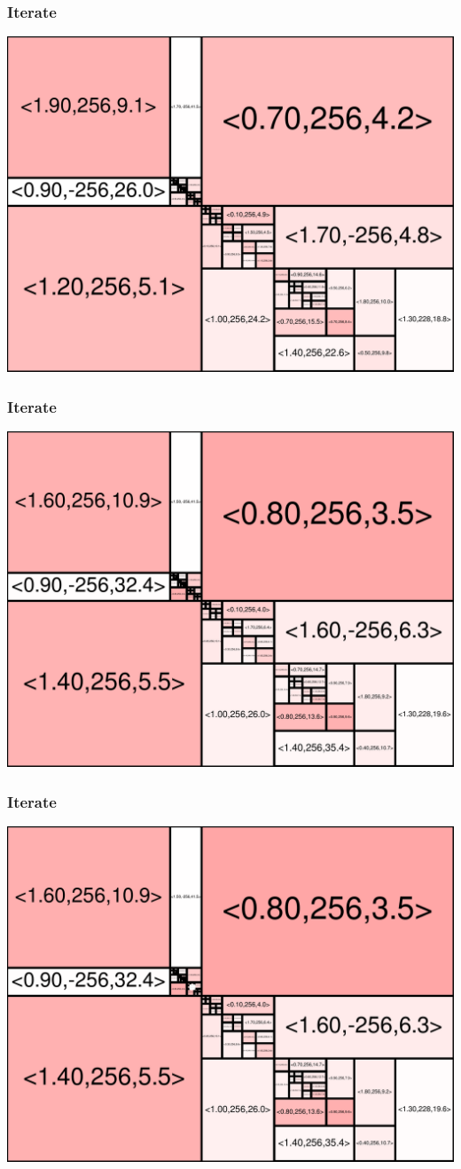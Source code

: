 \begin{frame}
\frametitle{Iterate}\begin{centering}\includegraphics[width=8.5 cm]{remy-graph/graph/test84.pdf}

\end{centering}\end{frame}


\begin{frame}
\frametitle{Iterate}\begin{centering}\includegraphics[width=8.5 cm]{remy-graph/graph/test85.pdf}

\end{centering}\end{frame}


\begin{frame}
\frametitle{Iterate}\begin{centering}\includegraphics[width=8.5 cm]{remy-graph/graph/test86.pdf}

\end{centering}\end{frame}


